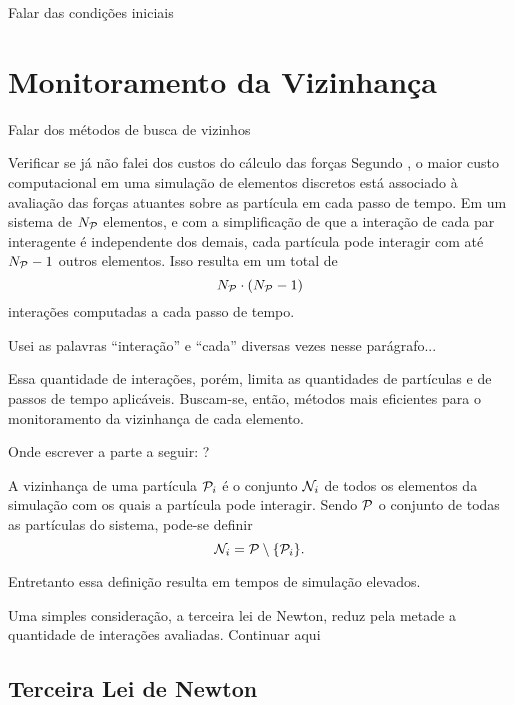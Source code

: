 \alert{Falar das condições iniciais}

\section{Monitoramento da Vizinhança} \label{sec:neighborhood}

\alert{Falar dos métodos de busca de vizinhos}

\alert{Verificar se já não falei dos custos do cálculo das forças} Segundo , o maior custo computacional em uma simulação de elementos discretos está associado à avaliação das forças atuantes sobre as partícula em cada passo de tempo. Em um sistema de \(N_{\mathcal{P}}\) elementos, e com a simplificação de que a interação de cada par interagente é independente dos demais, cada partícula pode interagir com até \(N_{\mathcal{P}}-1\) outros elementos. Isso resulta em um total de
\begin{equation*}
	\numberOfParticles\cdot\pqty{\numberOfParticles-1}
\end{equation*}
interações computadas a cada passo de tempo.

\alert{Usei as palavras ``interação'' e ``cada'' diversas vezes nesse parágrafo...}

Essa quantidade de interações, porém, limita as quantidades de partículas e de passos de tempo aplicáveis. Buscam-se, então, métodos mais eficientes para o monitoramento da vizinhança de cada elemento. 

\alert{Onde escrever a parte a seguir: ?}

A vizinhança de uma partícula \({\mathcal{P}}_{i}\) é o conjunto \({\mathcal{N}}_{i}\) de todos os elementos da simulação com os quais a partícula pode interagir. Sendo \(\mathcal{P}\) o conjunto de todas as partículas do sistema, pode-se definir
\begin{equation*}
	\neighborhoodi = \particleSet \setminus \Bqty{\particlei}.
\end{equation*}

Entretanto essa definição resulta em tempos de simulação elevados.

Uma simples consideração, a terceira lei de Newton, reduz pela metade a quantidade de interações avaliadas. \alert{Continuar aqui}

\subsection{Terceira Lei de Newton}

